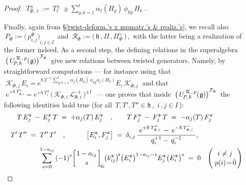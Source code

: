 \documentclass[12pt,reqno,twoside,a4paper]{amsart}
\numberwithin{equation}{section}
\theoremstyle{definition}
\newtheorem{free text}[lema]{}
\theoremstyle{remark}
\newcommand{\zero}{{\bar{0}}}
\newcommand{\R}{{\mathcal R}}
\newcommand{\F}{{\mathcal F}}
\def \K {\mathcal{K}}
\def \L {\mathcal{L}}
\def \lieg{\mathfrak{g}}
\def \lieh{\mathfrak{h}}
\def \uRpPhg{U^{\,\R\,,\,p}_{\!P,\hskip0,7pt\hbar}(\hskip0,5pt\lieg)}
\theoremstyle{plain}
\begin{document}
\begin{proof}
%
 $ \; T^\pm_{{\scriptscriptstyle \Phi},\ell} := \, T^\pm_\ell \, \pm {\textstyle \sum\limits_{g,k=1}^t} \alpha_\ell(H_g) \, \phi_{kg} \, H_k \; $.
                                                                    \par
   Finally, again from  \S \ref{twist-deform.'s x mpmatr.'s & realiz.'s},  we recall also
%
  $ \, P_{\scriptscriptstyle \Phi} := {\big(\, p^{\scriptscriptstyle \Phi}_{i,j} \big)}_{i, j \in I} \, $  and
  $ \, \R_\Phi := \big(\, \lieh \, , \Pi \, , \Pi^\vee_{\scriptscriptstyle \Phi} \,\big) \, $,
  \,with the latter being a realization of the former indeed.
%
 \vskip3pt
%
   As a second step, the defining relations in the superalgebra  $ \,{\big(\, \uRpPhg \big)}^{\F_\Phi} \, $  give new relations between twisted generators.  Namely, by straightforward computations   --- for instance using that  $ \; \K_{\Phi,j} \, E_i = e^{\hbar\, 2^{-1} \, \sum_{g,k=1}^t \alpha_j(H_g) \, \phi_{kg} \alpha_i(H_k)} E_i \, \K_{\Phi,j} \; $  and that  $ \; e^{+\hbar \, T^{\pm}_{{\scriptscriptstyle \Phi},i}} = e^{+\hbar \, T_i^\pm} \big(\, \K_{\Phi,i} \, \L_{\Phi,i}^{-1} \,\big)^{\pm 1} \; $  ---   one proves that inside  $ \,{\big(\, \uRpPhg \big)}^{\F_\Phi} \, $  the following identities hold true (for all $ \, T , T' , T'' \in \lieh \, $,  $ \, i \, , j \in I \, $):
%
  $$  \begin{aligned}
   T \, E^{\scriptscriptstyle \Phi}_j \, - \, E^{\scriptscriptstyle \Phi}_j \, T  \; = \;  +\alpha_j(T) \, E^{\scriptscriptstyle \Phi}_j  \quad ,
   \qquad  T \, F^{\scriptscriptstyle \Phi}_j \, - \, F^{\scriptscriptstyle \Phi}_j \, T  \; = \;  -\alpha_j(T) \, F^{\scriptscriptstyle \Phi}_j   \hskip43pt  \\
%
   T' \, T''  \; = \;  T'' \, T'  \quad ,  \quad \qquad
   \big[ E^{\scriptscriptstyle \Phi}_i , F^{\scriptscriptstyle \Phi}_j \big]  \; = \; \delta_{i,j} \, {{\; e^{+\hbar \, T^+_{{\scriptscriptstyle \Phi},i}} \, -
   \, e^{-\hbar \, T^-_{{\scriptscriptstyle \Phi},i}} \;} \over {\; q_i^{+1} - \, q_i^{-1} \;}},   \hskip65pt  \\
%
   \sum\limits_{s=0}^{1-a_{ij}} {(-1)}^s {\left[ {{1-a_{ij}} \atop s}
\right]}_{\!q_i} \!
 {\big( k_{ij}^{\scriptscriptstyle \Phi} \big)}^{\!s}
 {\big( E^{\scriptscriptstyle \Phi}_i \big)}^{1-a_{ij}-s} E^{\scriptscriptstyle \Phi}_j {\big( E^{\scriptscriptstyle \Phi}_i \big)}^s
\; = \;  0   \quad   \Bigg( {{i \neq j} \atop {\,p(i) \!=\! \zero}} \Bigg)  \\

\end{aligned}$$
\end{proof}
\end{document}
